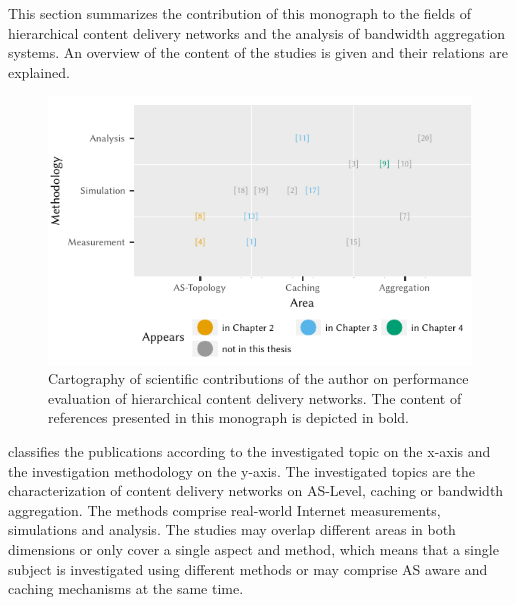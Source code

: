 This section summarizes the contribution of this monograph to the fields of hierarchical content delivery networks and the analysis of bandwidth aggregation systems.
An overview of the content of the studies is given and their relations are explained.

\begin{figure}
\centering
\includegraphics{figures/publications}
\caption{Cartography of scientific contributions of the author on performance evaluation of hierarchical content delivery networks. The content of references presented in this monograph is depicted in bold.}\label{fig:introduction:publications}
\end{figure}

 classifies the publications according to the investigated topic on the x-axis and the investigation methodology on the y-axis.
The investigated topics are the characterization of content delivery networks on AS-Level, caching or bandwidth aggregation.
The methods comprise real-world Internet measurements, simulations and analysis.
The studies may overlap different areas in both dimensions or only cover a single aspect and method, which means that a single subject is investigated using different methods or may comprise AS aware and caching mechanisms at the same time.



